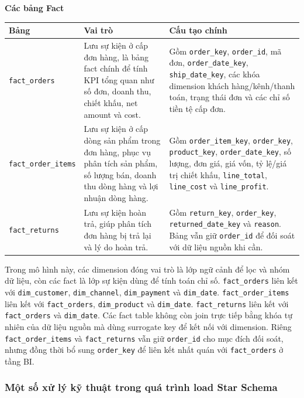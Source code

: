 \documentclass[12pt,a4paper]{article}
\newcommand{\code}[1]{\texttt{#1}}
\begin{document}
\textbf{Các bảng Fact}

\begin{table}[H]
\centering
\footnotesize
\begin{tabularx}{\textwidth}{|p{}|Y|Y|}
\hline
\textbf{Bảng} & \textbf{Vai trò} & \textbf{Cấu tạo chính} \\
\hline
\code{fact\_orders} & Lưu sự kiện ở cấp đơn hàng, là bảng fact chính để tính KPI tổng quan như số đơn, doanh thu, chiết khấu, net amount và cost. & Gồm \code{order\_key}, \code{order\_id}, mã đơn, \code{order\_date\_key}, \code{ship\_date\_key}, các khóa dimension khách hàng/kênh/thanh toán, trạng thái đơn và các chỉ số tiền tệ cấp đơn. \\
\hline
\code{fact\_order\_items} & Lưu sự kiện ở cấp dòng sản phẩm trong đơn hàng, phục vụ phân tích sản phẩm, số lượng bán, doanh thu dòng hàng và lợi nhuận dòng hàng. & Gồm \code{order\_item\_key}, \code{order\_key}, \code{product\_key}, \code{order\_date\_key}, số lượng, đơn giá, giá vốn, tỷ lệ/giá trị chiết khấu, \code{line\_total}, \code{line\_cost} và \code{line\_profit}. \\
\hline
\code{fact\_returns} & Lưu sự kiện hoàn trả, giúp phân tích đơn hàng bị trả lại và lý do hoàn trả. & Gồm \code{return\_key}, \code{order\_key}, \code{returned\_date\_key} và \code{reason}. Bảng vẫn giữ \code{order\_id} để đối soát với dữ liệu nguồn khi cần. \\
\hline
\end{tabularx}
\end{table}

Trong mô hình này, các dimension đóng vai trò là lớp ngữ cảnh để lọc và nhóm dữ liệu, còn các fact là lớp sự kiện dùng để tính toán chỉ số. \code{fact\_orders} liên kết với \code{dim\_customer}, \code{dim\_channel}, \code{dim\_payment} và \code{dim\_date}. \code{fact\_order\_items} liên kết với \code{fact\_orders}, \code{dim\_product} và \code{dim\_date}. \code{fact\_returns} liên kết với \code{fact\_orders} và \code{dim\_date}. Các fact table không còn join trực tiếp bằng khóa tự nhiên của dữ liệu nguồn mà dùng surrogate key để kết nối với dimension. Riêng \code{fact\_order\_items} và \code{fact\_returns} vẫn giữ \code{order\_id} cho mục đích đối soát, nhưng đồng thời bổ sung \code{order\_key} để liên kết nhất quán với \code{fact\_orders} ở tầng BI.

\subsubsection{Một số xử lý kỹ thuật trong quá trình load Star Schema}
\end{document}
